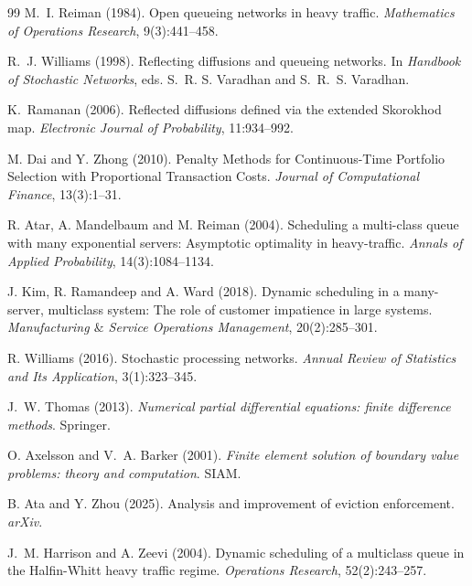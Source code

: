 \documentclass[11pt]{article}
\theoremstyle{definition}
\theoremstyle{plain}
\begin{document}
\begin{appendices}
\begin{thebibliography}{99}
 M.~I. Reiman (1984). \newblock Open queueing networks in heavy traffic. \newblock \emph{Mathematics of Operations Research}, 9(3):441--458.

 R.~J. Williams (1998). \newblock Reflecting diffusions and queueing networks. \newblock In \emph{Handbook of Stochastic Networks}, eds. S.~R. S. Varadhan and S.~R.~S. Varadhan. %

 K.~Ramanan (2006). \newblock Reflected diffusions defined via the extended Skorokhod map. \newblock \emph{Electronic Journal of Probability}, 11:934--992.

 M. Dai and Y. Zhong (2010). \newblock Penalty Methods for Continuous-Time Portfolio Selection with Proportional Transaction Costs. \newblock \emph{Journal of Computational Finance}, 13(3):1--31.

 R. Atar, A. Mandelbaum and M. Reiman (2004). \newblock Scheduling a multi-class queue with many exponential servers: Asymptotic optimality in heavy-traffic. 
\newblock \emph{Annals of Applied Probability}, 14(3):1084--1134.

 J. Kim, R. Ramandeep and A. Ward (2018). \newblock Dynamic scheduling in a many-server, multiclass system: The role of customer impatience in large systems.  
\newblock \emph{Manufacturing $\&$ Service Operations Management}, 20(2):285--301.

 R. Williams (2016). \newblock Stochastic processing networks. \newblock \emph{Annual Review of Statistics and Its Application}, 3(1):323--345.

 J.~W. Thomas (2013). \newblock \emph{Numerical partial differential equations: finite difference methods}. \newblock Springer. 

 O. Axelsson and V.~A. Barker (2001). \newblock \emph{Finite element solution of boundary value problems: theory and computation}. \newblock SIAM.

 B. Ata and Y. Zhou (2025). \newblock Analysis and improvement of eviction enforcement. \newblock \emph{arXiv}. 

 J.~M. Harrison and A. Zeevi (2004). \newblock Dynamic scheduling of a multiclass queue in the Halfin-Whitt heavy traffic regime. 
\newblock \emph{Operations Research}, 52(2):243--257.


\end{thebibliography}
\end{appendices}
\end{document}
